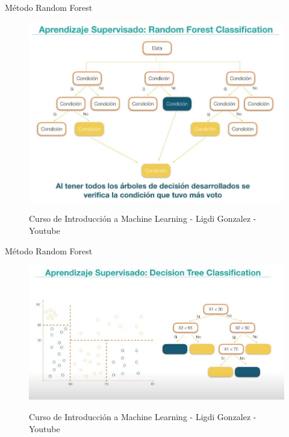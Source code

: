 \begin{frame}{Método Random Forest}
	\begin{figure}
		\includegraphics[scale=0.4]{imgs/random_forest.JPG}\\
		\caption{Curso de Introducción a Machine Learning - Ligdi Gonzalez - Youtube}
	\end{figure}
\end{frame}


\begin{frame}{Método Random Forest}
	\begin{figure}
		\includegraphics[scale=0.6]{imgs/random_forest_1.JPG}\\
		\caption{Curso de Introducción a Machine Learning - Ligdi Gonzalez - Youtube}
	\end{figure}
\end{frame}